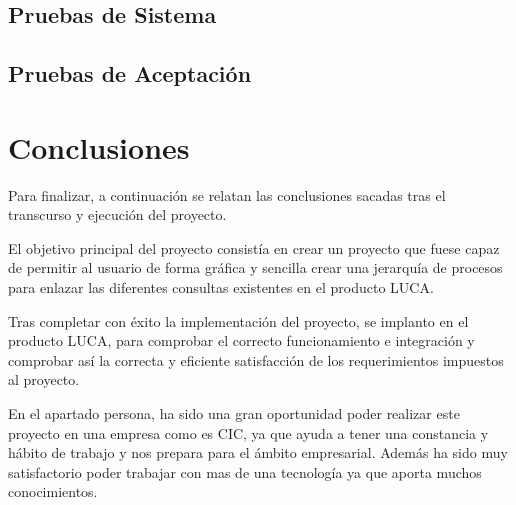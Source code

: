 \documentclass[a4paper,12pt]{book}
\begin{document}
		\section{Pruebas de Sistema}
		
		\section{Pruebas de Aceptación}
	
	
	\clearpage
	
	
	
	\chapter{Conclusiones}
	
	Para finalizar, a continuación se relatan las conclusiones sacadas tras el transcurso y ejecución del proyecto.
	
	\vspace{5mm}
	
	El objetivo principal del proyecto consistía en crear un proyecto que fuese capaz de permitir al usuario de forma gráfica y sencilla crear una jerarquía de procesos para enlazar las diferentes consultas existentes en el producto LUCA. 
	
	\vspace{5mm}
	
	Tras completar con éxito la implementación del proyecto, se implanto en el producto LUCA, para comprobar el correcto funcionamiento e integración y comprobar así la correcta y eficiente satisfacción de los requerimientos impuestos al proyecto.
	
	\vspace{5mm}
	
	En el apartado persona, ha sido una gran oportunidad poder realizar este proyecto en una empresa como es CIC, ya que ayuda a tener una constancia y hábito de trabajo y nos prepara para el ámbito empresarial. Además ha sido muy satisfactorio poder trabajar con mas de una tecnología ya que aporta muchos conocimientos.


	\clearpage
	
	
	
	
\end{document}

